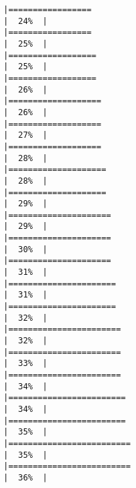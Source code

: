 \documentclass[
]{article}
\begin{document}
\begin{verbatim}
|=================                                                     |  24%  |                                                                              |=================                                                     |  25%  |                                                                              |==================                                                    |  25%  |                                                                              |==================                                                    |  26%  |                                                                              |===================                                                   |  26%  |                                                                              |===================                                                   |  27%  |                                                                              |===================                                                   |  28%  |                                                                              |====================                                                  |  28%  |                                                                              |====================                                                  |  29%  |                                                                              |=====================                                                 |  29%  |                                                                              |=====================                                                 |  30%  |                                                                              |=====================                                                 |  31%  |                                                                              |======================                                                |  31%  |                                                                              |======================                                                |  32%  |                                                                              |=======================                                               |  32%  |                                                                              |=======================                                               |  33%  |                                                                              |=======================                                               |  34%  |                                                                              |========================                                              |  34%  |                                                                              |========================                                              |  35%  |                                                                              |=========================                                             |  35%  |                                                                              |=========================                                             |  36%  |                                                                              
\end{verbatim}
\end{document}
